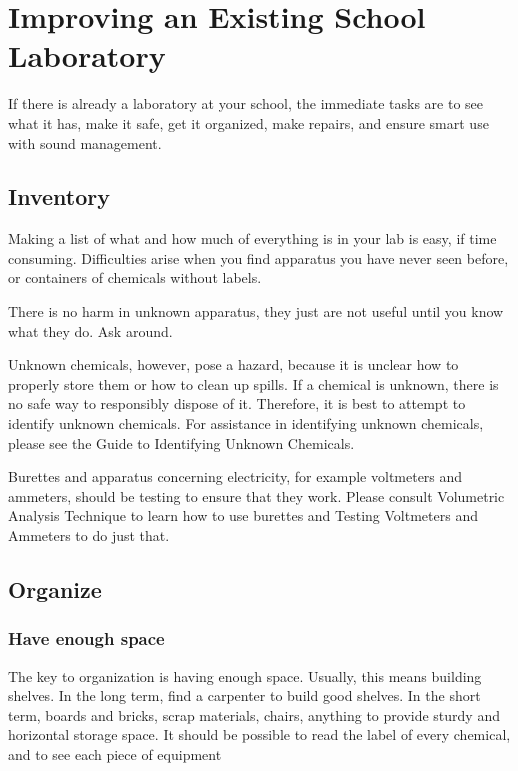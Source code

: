 \chapter{Improving an Existing School Laboratory}

If there is already a laboratory at your school, 
the immediate tasks are to see what it has, 
make it safe, 
get it organized, 
make repairs, 
and ensure smart use with sound management.

\section{Inventory}

Making a list of what and how much of everything is in your lab is easy, 
if time consuming. 
Difficulties arise when you find apparatus you have never seen before, 
or containers of chemicals without labels.

There is no harm in unknown apparatus, 
they just are not useful until you know what they do. 
Ask around.

Unknown chemicals, 
however, 
pose a hazard, 
because it is unclear how to properly store them or how to clean up spills. 
If a chemical is unknown, 
there is no safe way to responsibly dispose of it. 
Therefore, 
it is best to attempt to identify unknown chemicals. 
For assistance in identifying unknown chemicals, 
please see the Guide to Identifying Unknown Chemicals.

Burettes and apparatus concerning electricity, 
for example voltmeters and ammeters, 
should be testing to ensure that they work. 
Please consult Volumetric Analysis Technique 
to learn how to use burettes 
and Testing Voltmeters and Ammeters to do just that.

\section{Organize}

\subsection{Have enough space}
The key to organization is having enough space. 
Usually, 
this means building shelves. 
In the long term, 
find a carpenter to build good shelves. 
In the short term, 
boards and bricks, 
scrap materials, 
chairs, 
anything to provide sturdy and horizontal storage space. 
It should be possible to read the label of every chemical, 
and to see each piece of equipment


